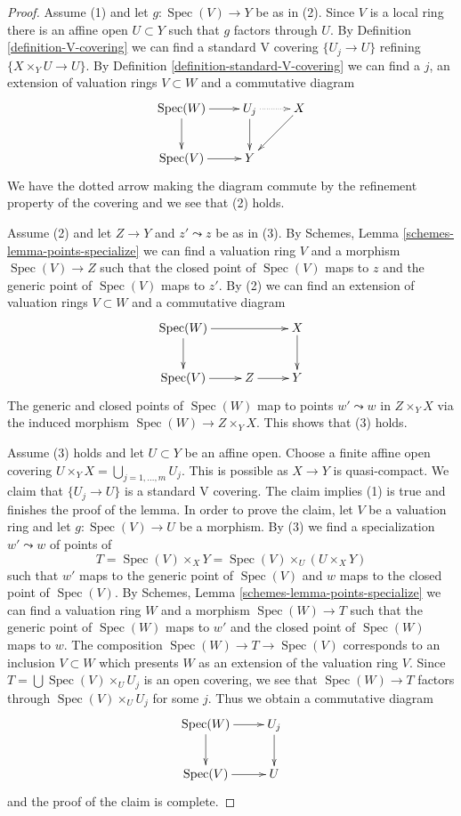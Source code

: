 \documentclass[10pt,a4paper]{amsart}
\theoremstyle{plain}
\theoremstyle{definition}
\theoremstyle{remark}
\numberwithin{equation}{subsection}
\def\Spec{\mathop{\mathrm{Spec}}}
\begin{document}
\begin{proof}
Assume (1) and let $g : \Spec(V) \to Y$ be as in (2).
Since $V$ is a local ring there is an affine open $U \subset Y$
such that $g$ factors through $U$. By Definition \ref{definition-V-covering}
we can find a standard V covering $\{U_j \to U\}$ refining
$\{X \times_Y U \to U\}$. By Definition \ref{definition-standard-V-covering}
we can find a $j$, an extension of valuation rings $V \subset W$
and a commutative diagram
$$
\xymatrix{
\Spec(W) \ar[r] \ar[d] & U_j \ar[d] \ar@{..>}[r] & X \ar[ld] \\
\Spec(V) \ar[r] & Y
}
$$
We have the dotted arrow making the diagram commute by the refinement
property of the covering and we see that (2) holds.

\medskip\noindent
Assume (2) and let $Z \to Y$ and $z' \leadsto z$ be as in (3).
By Schemes, Lemma \ref{schemes-lemma-points-specialize}
we can find a valuation ring $V$ and a morphism $\Spec(V) \to Z$
such that the closed point of $\Spec(V)$ maps to $z$ and the
generic point of $\Spec(V)$ maps to $z'$. By (2) we can find an
extension of valuation rings $V \subset W$ and a
commutative diagram
$$
\xymatrix{
\Spec(W) \ar[rr] \ar[d] & & X \ar[d] \\
\Spec(V) \ar[r] & Z \ar[r] & Y
}
$$
The generic and closed points of $\Spec(W)$ map to points
$w' \leadsto w$ in $Z \times_Y X$ via the
induced morphism $\Spec(W) \to Z \times_Y X$.
This shows that (3) holds.

\medskip\noindent
Assume (3) holds and let $U \subset Y$ be an affine open.
Choose a finite affine open covering
$U \times_Y X = \bigcup_{j = 1, \ldots, m} U_j$.
This is possible as $X \to Y$ is quasi-compact.
We claim that $\{U_j \to U\}$ is a standard V covering.
The claim implies (1) is true and finishes the proof of the lemma.
In order to prove the claim, let $V$ be a valuation ring
and let $g : \Spec(V) \to U$ be a morphism.
By (3) we find a specialization $w' \leadsto w$ of
points of
$$
T = \Spec(V) \times_X Y = \Spec(V) \times_U (U \times_X Y)
$$
such that $w'$ maps to the generic point of $\Spec(V)$
and $w$ maps to the closed point of $\Spec(V)$.
By Schemes, Lemma \ref{schemes-lemma-points-specialize}
we can find a valuation ring $W$ and a morphism
$\Spec(W) \to T$ such that the generic point of $\Spec(W)$
maps to $w'$ and the closed point of $\Spec(W)$ maps to $w$.
The composition $\Spec(W) \to T \to \Spec(V)$ corresponds
to an inclusion $V \subset W$ which presents $W$ as an
extension of the valuation ring $V$.
Since $T = \bigcup \Spec(V) \times_U U_j$ is an open
covering, we see that $\Spec(W) \to T$ factors through
$\Spec(V) \times_U U_j$ for some $j$. Thus we obtain
a commutative diagram
$$
\xymatrix{
\Spec(W) \ar[d] \ar[r] & U_j \ar[d] \\
\Spec(V) \ar[r] & U
}
$$
and the proof of the claim is complete.
\end{proof}
\end{document}

